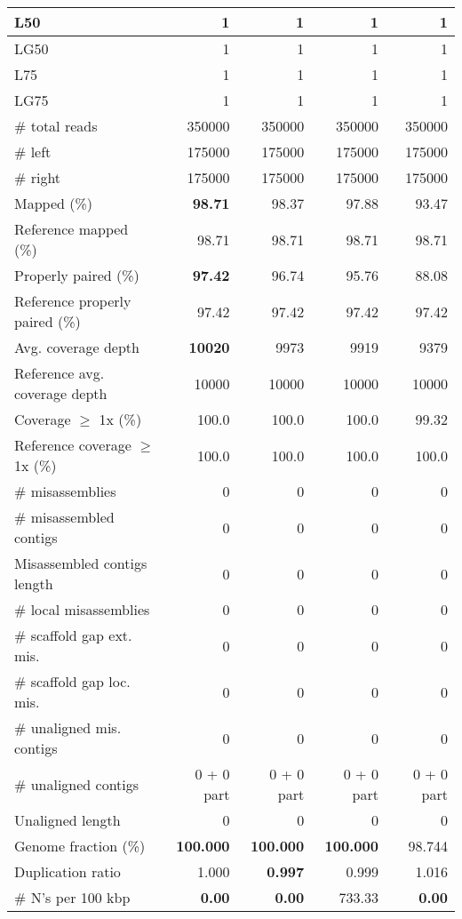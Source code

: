 \documentclass[12pt,a4paper]{article}
\begin{document}
\begin{table}[ht]
\begin{center}
\begin{tabular}{|l*{4}{|r}|}
L50 & 1 & 1 & 1 & 1 \\ \hline
LG50 & 1 & 1 & 1 & 1 \\ \hline
L75 & 1 & 1 & 1 & 1 \\ \hline
LG75 & 1 & 1 & 1 & 1 \\ \hline
\# total reads & 350000 & 350000 & 350000 & 350000 \\ \hline
\# left & 175000 & 175000 & 175000 & 175000 \\ \hline
\# right & 175000 & 175000 & 175000 & 175000 \\ \hline
Mapped (\%) & {\bf 98.71} & 98.37 & 97.88 & 93.47 \\ \hline
Reference mapped (\%) & 98.71 & 98.71 & 98.71 & 98.71 \\ \hline
Properly paired (\%) & {\bf 97.42} & 96.74 & 95.76 & 88.08 \\ \hline
Reference properly paired (\%) & 97.42 & 97.42 & 97.42 & 97.42 \\ \hline
Avg. coverage depth & {\bf 10020} & 9973 & 9919 & 9379 \\ \hline
Reference avg. coverage depth & 10000 & 10000 & 10000 & 10000 \\ \hline
Coverage $\geq$ 1x (\%) & 100.0 & 100.0 & 100.0 & 99.32 \\ \hline
Reference coverage $\geq$ 1x (\%) & 100.0 & 100.0 & 100.0 & 100.0 \\ \hline
\# misassemblies & 0 & 0 & 0 & 0 \\ \hline
\# misassembled contigs & 0 & 0 & 0 & 0 \\ \hline
Misassembled contigs length & 0 & 0 & 0 & 0 \\ \hline
\# local misassemblies & 0 & 0 & 0 & 0 \\ \hline
\# scaffold gap ext. mis. & 0 & 0 & 0 & 0 \\ \hline
\# scaffold gap loc. mis. & 0 & 0 & 0 & 0 \\ \hline
\# unaligned mis. contigs & 0 & 0 & 0 & 0 \\ \hline
\# unaligned contigs & 0 + 0 part & 0 + 0 part & 0 + 0 part & 0 + 0 part \\ \hline
Unaligned length & 0 & 0 & 0 & 0 \\ \hline
Genome fraction (\%) & {\bf 100.000} & {\bf 100.000} & {\bf 100.000} & 98.744 \\ \hline
Duplication ratio & 1.000 & {\bf 0.997} & 0.999 & 1.016 \\ \hline
\# N's per 100 kbp & {\bf 0.00} & {\bf 0.00} & 733.33 & {\bf 0.00} \\ \hline

\end{tabular}
\end{center}
\end{table}
\end{document}

